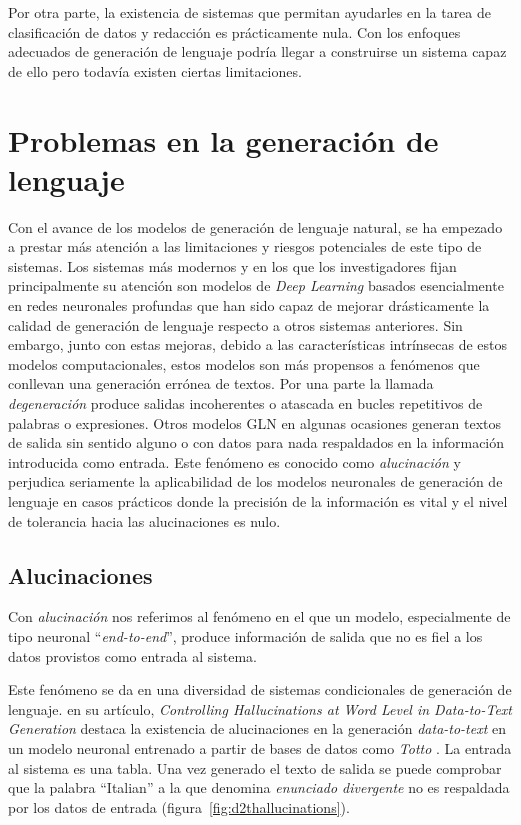 Por otra parte, la existencia de sistemas que permitan ayudarles en la tarea de clasificación de datos y redacción es prácticamente nula. Con los enfoques adecuados de generación de lenguaje podría llegar a construirse un sistema capaz de ello pero todavía existen ciertas limitaciones.



\section{Problemas en la generación de lenguaje}

Con el avance de los modelos de generación de lenguaje natural, se ha empezado a prestar más atención a las limitaciones y riesgos potenciales de este tipo de sistemas. Los sistemas más modernos y en los que los investigadores fijan principalmente su atención son modelos de \textit{Deep Learning} basados esencialmente en redes neuronales profundas que han sido capaz de mejorar drásticamente la calidad de generación de lenguaje respecto a otros sistemas anteriores. Sin embargo, junto con estas mejoras, debido a las características intrínsecas de estos modelos computacionales, estos modelos son más propensos a fenómenos que conllevan una generación errónea de textos. Por una parte la llamada \textit{degeneración} produce salidas incoherentes o atascada en bucles repetitivos de palabras o expresiones. Otros modelos GLN en algunas ocasiones generan textos de salida sin sentido alguno o con datos para nada respaldados en la información introducida como entrada. Este fenómeno es conocido como \textit{alucinación} y perjudica seriamente la aplicabilidad de los modelos neuronales de generación de lenguaje en casos prácticos donde la precisión de la información es vital y el nivel de tolerancia hacia las alucinaciones es nulo.

\subsection{Alucinaciones}

Con \textit{alucinación} nos referimos al fenómeno en el que un modelo, especialmente de tipo neuronal ``\textit{end-to-end}'', produce información de salida que no es fiel a los datos provistos como entrada al sistema. 

Este fenómeno se da en una diversidad de sistemas condicionales de generación de lenguaje. \cite{hallucinations_data2text} en su artículo, \textit{Controlling Hallucinations at Word Level in Data-to-Text Generation} destaca la existencia de alucinaciones en la generación \textit{data-to-text} en un modelo neuronal entrenado a partir de bases de datos como \textit{Totto} \citep{parikh-etal-2020-totto}. La entrada al sistema es una tabla. Una vez generado el texto de salida se puede comprobar que la palabra ``Italian'' a la que denomina \textit{enunciado divergente} no es respaldada por los datos de entrada (figura~\ref{fig:d2thallucinations}).

